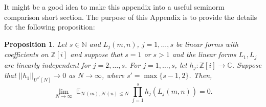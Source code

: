 \documentclass[11pt]{amsart}
\newtheorem{proposition}[lemma]{Proposition}
\theoremstyle{definition}
\DeclareMathOperator*{\E}{\mathbb{E}}
\newcommand{\C}{{\mathbb C}}
\newcommand{\N}{{\mathbb N}}
\newcommand{\NN}{{\mathcal N}}
\newcommand{\Z}{{\mathbb Z}}
\begin{document}
\iffalse
{\color{red} It might be a good idea to make this appendix into a useful seminorm comparison short section.}
The purpose of this Appendix is to provide the details for the following proposition:
\begin{proposition}
Let $s \in \N$ and $L_j(m,n)$, $j=1,\dots, s$ be linear forms with coefficients on $\Z[i]$ and suppose that $s=1$ or $s>1$ and the linear forms $L_1, L_j$ are linearly independent for $j=2,\dots, s$. For $j=1,\dots, s$, let $h_j: \Z[i] \to \C$. Suppose that $||h_1||_{U^{s'}[N]} \to 0$ as $N \to \infty$, where $s'=\max\{s-1,2\}$. Then,
\begin{equation}\label{aperiodicconvex0}
    \lim_{N \to \infty} \E_{\NN(m),\NN(n) \leq  N} \prod_{j=1}^s h_j(L_j(m,n))  = 0.
\end{equation}  



\end{proposition}
\end{document}

